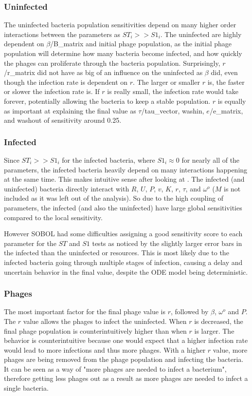 \subsubsection{Uninfected}
The uninfected bacteria population sensitivities depend on many higher order interactions between the parameters as $ST_i >> S1_i$. 
The uninfected are highly dependent on $\beta$/B\_matrix and initial phage population, as the initial phage population will determine how many bacteria become infected, and how quickly the phages can proliferate through the bacteria population. 
Surprisingly, $r$/r\_matrix did not have as big of an influence on the uninfected as $\beta$ did, even though the infection rate is dependent on $r$. 
The larger or smaller $r$ is, the faster or slower the infection rate is. If $r$ is really small, the infection rate would take forever, potentially allowing the bacteria to keep a stable population. 
$r$ is equally as important at explaining the final value as $\tau$/tau\_vector, washin, $e$/e\_matrix, and washout of sensitivity around 0.25. 

\subsubsection{Infected}
Since $ST_i >> S1_i$ for the infected bacteria, where $S1_i \approx 0$ for nearly all of the parameters, the infected bacteria heavily depend on many interactions happening at the same time. 
This makes intuitive sense after looking at . 
The infected (and uninfected) bacteria directly interact with $R$, $U$, $P$, $v$, $K$, $r$, $\tau$, and $\omega^o$ ($M$ is not included as it was left out of the analysis). 
So due to the high coupling of parameters, the infected (and also the uninfected) have large global sensitivities compared to the local sensitivity. 

However SOBOL had some difficulties assigning a good sensitivity score to each parameter for the $ST$ and $S1$ tests as noticed by the slightly larger error bars in the infected than the uninfected or resources. 
This is most likely due to the infected bacteria going through multiple stages of infection, causing a delay and uncertain behavior in the final value, despite the ODE model being deterministic. 

\subsubsection{Phages}
The most important factor for the final phage value is $r$, followed by $\beta$, $\omega^o$ and $P$. 
The $r$ value allows the phages to infect the uninfected. 
When $r$ is decreased, the final phage population is counterintuitively higher than when $r$ is larger. 
The behavior is counterintuitive because one would expect that a higher infection rate would lead to more infections and thus more phages. 
With a higher $r$ value, more phages are being removed from the phage population and infecting the bacteria. 
It can be seen as a way of "more phages are needed to infect a bacterium", therefore getting less phages out as a result as more phages are needed to infect a single bacteria. 

